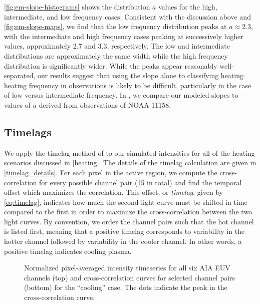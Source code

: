 \autoref{fig:em-slope-histograms} shows the distribution $a$ values for the high, intermediate, and low frequency cases. Consistent with the discussion above and \autoref{fig:em-slope-maps}, we find that the low frequency distribution peaks at $a\approx2.3$, with the intermediate and high frequency cases peaking at successively higher values, approximately 2.7 and 3.3, respectively. The low and intermediate distributions are approximately the same width while the high frequency distribution is significantly wider. While the peaks appear reasonably well-separated, our results suggest that using the \dem{} slope alone to classifying heating heating frequency in observations is likely to be difficult, particularly in the case of low versus intermediate frequency. In , we compare our modeled \dem{} slopes to values of $a$ derived from observations of NOAA 11158.


\subsection{Timelags}\label{timelags}

We apply the timelag method of \citet{viall_evidence_2012} to our simulated intensities for all of the heating scenarios discussed in \autoref{heating}. The details of the timelag calculation are given in \autoref{timelag_details}. For each pixel in the active region, we compute the cross-correlation for every possible channel pair (15 in total) and find the temporal offset which maximizes the correlation. This offset, or \textit{timelag}, given by \autoref{eq:timelag}, indicates how much the second light curve must be shifted in time compared to the first in order to maximize the cross-correlation between the two light curves. By convention, we order the channel pairs such that the hot channel is listed first, meaning that a positive timelag corresponds to variability in the hotter channel followed by variability in the cooler channel. In other words, a positive timelag indicates cooling plasma.

\begin{figure}
    \caption{Normalized pixel-averaged intensity timeseries for all six AIA EUV channels (top) and cross-correlation curves for selected channel pairs (bottom) for the ``cooling'' case. The dots indicate the peak in the cross-correlation curve.}
    \label{fig:correlation_1d}
\end{figure}

